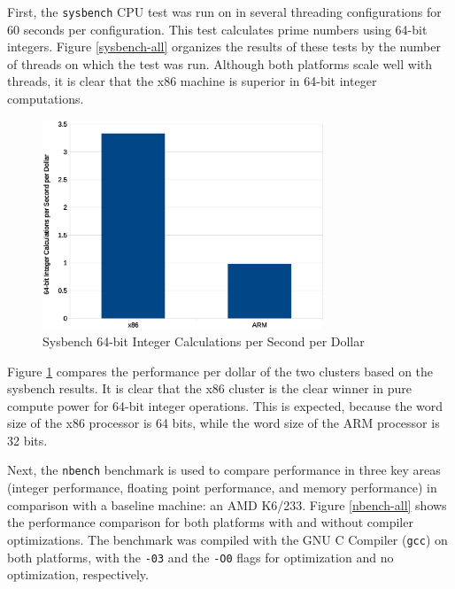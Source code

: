 \documentclass[11pt]{book}
\begin{document}
First, the \verb;sysbench; CPU test was run on in several threading configurations for 60
seconds per configuration.  This test calculates prime numbers using 64-bit
integers.  Figure \ref{sysbench-all} organizes the results of these tests by the number of
threads on which the test was run. Although both platforms scale well with threads, it is
clear that the x86 machine is superior in 64-bit integer computations.

\begin{figure}
\centering
\includegraphics[width=0.75\textwidth]{sysbench_cost}
\caption{Sysbench 64-bit Integer Calculations per Second per Dollar}
\label{sysbench-cost}
\end{figure}

Figure \ref{sysbench-cost} compares the performance per dollar of the two clusters based
on the sysbench results.  It is clear that the x86 cluster is the clear winner in pure
compute power for 64-bit integer operations.  This is expected, because the word size of
the x86 processor is 64 bits, while the word size of the ARM processor is 32 bits.

Next, the \verb;nbench; benchmark \cite{nbench} is used to compare performance in three
key areas (integer performance, floating point performance, and memory performance) in
comparison with a baseline machine: an AMD K6/233.  Figure \ref{nbench-all} shows the
performance comparison for both platforms with and without compiler optimizations.  The
benchmark was compiled with the GNU C Compiler (\verb;gcc;) on both platforms, with the
\verb;-03; and the \verb;-O0; flags for optimization and no optimization, respectively.
\end{document}
